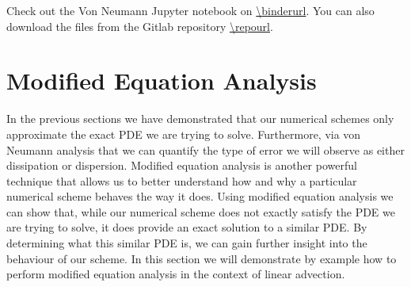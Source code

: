 \begin{jupyternote}
	Check out the Von Neumann Jupyter notebook on \url{\binderurl}. You can also download the files from the Gitlab repository \url{\repourl}.
\end{jupyternote}
\chapter{Modified Equation Analysis}
In the previous sections we have demonstrated that our numerical schemes only approximate the exact PDE we are trying to solve. Furthermore, via von Neumann analysis that we can quantify the type of error we will observe as either dissipation or dispersion. Modified equation analysis is another powerful technique that allows us to better understand how and why a particular numerical scheme behaves the way it does. Using modified equation analysis we can show that, while our numerical scheme does not exactly satisfy the PDE we are trying to solve, it does provide an exact solution to a similar PDE. By determining what this similar PDE is, we can gain further insight into the behaviour of our scheme. In this section we will demonstrate by example how to perform modified equation analysis in the context of linear advection.

